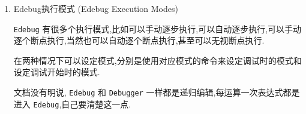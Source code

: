 \documentclass[11pt]{article}
\begin{document}
\begin{enumerate}
如果要批量移除 \texttt{instrumentations} 先把 \texttt{edebug-all-defs} 切换回去再次运行命令就可以了(可以用 \texttt{eval-buffer} 体验一下).

还有一个特定用来控制 \texttt{eval-region} 是否 \texttt{instrument} 的 \texttt{edebug-all-forms}.

\texttt{M-x edebug-eval-top-level-form} 会无视 \texttt{edebug-all-defs} 和 \texttt{edebug-all-forms} 的值来进行 \texttt{instrumenting}. \texttt{edebug-defun} 是它的别名.

当 \texttt{Edebug} 激活的时候,命令I (\texttt{edebug-instrument-callee}) 可以根据调用来 \texttt{instrument} 定义(当然只能是没有添加instrumentation的情况下).

比如,

\begin{verbatim}
(defun fac (n)
  (if (< 0 n)
      (* n (fac (1- n)))
    (return-res 1)))

(defun return-res (n)
  (+ n 0))

(fac 3)
\end{verbatim}

如果 \texttt{edebug} 激活了,上面 \texttt{instrument fac} 只会给 \texttt{fac} 添加 \texttt{instrumentation},调试的时候可以把指针移动到 \texttt{(return-res 1)} 的前面使用I命令,

这样在 \texttt{fac} 调用 \texttt{(return-res 1)} 的时候就会进入 \texttt{return-res} .当然只能在 \texttt{Edebug} 知道定义源代码位置的时候才可以使用这命令.

如果想直接跳进 \texttt{return-res},可以直接使用i命令,它会先是 \texttt{instrument} 定义并且直接跳转.

Edebug 知道如何 \texttt{instrument} 所有标准 \texttt{special forms},但是不能靠它自己判断用户定义宏(user-defined macro)的参数信息.

因此唯一通过使用 \texttt{Edebug specifications} 来提供信息.当 \texttt{Edebug} 第一次 \texttt{instrument} 代码,它会运行 \texttt{edebug-setup-hook} 钩子然后把这个钩子设置为 \texttt{nil},可以使用这个钩子提供 \texttt{Edebug specification}.


\item Edebug执行模式 (Edebug Execution Modes)
\label{sec:org4b89d50}

\texttt{Edebug} 有很多个执行模式,比如可以手动逐步执行,可以自动逐步执行,可以手动逐个断点执行,当然也可以自动逐个断点执行,甚至可以无视断点执行.

在两种情况下可以设定模式,分别是使用对应模式的命令来设定调试时的模式和设定调试开始时的模式.

文档没有明说, \texttt{Edebug} 和 \texttt{Debugger} 一样都是递归编辑,每运算一次表达式都是进入 \texttt{Edebug},自己要清楚这一点.


\end{enumerate}
\end{document}
